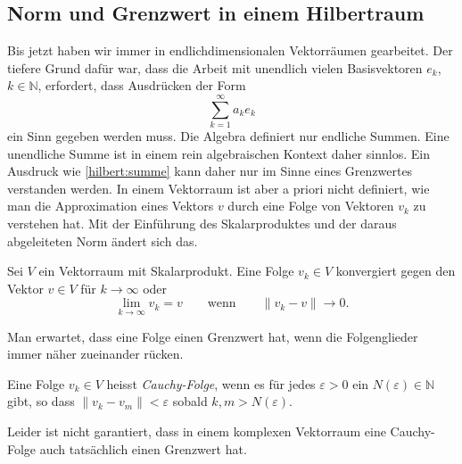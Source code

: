\subsection{Norm und Grenzwert in einem Hilbertraum
\label{subsection:norm-und-grenzwert}}
Bis jetzt haben wir immer in endlichdimensionalen Vektorräumen gearbeitet.
Der tiefere Grund dafür war, dass die Arbeit mit unendlich vielen Basisvektoren
$e_k$, $k\in\mathbb N$, erfordert, dass Ausdrücken der Form
\begin{equation}
\sum_{k=1}^\infty a_k e_k
\label{hilbert:summe}
\end{equation}
ein Sinn gegeben werden muss.
Die Algebra definiert nur endliche Summen.
Eine unendliche Summe ist in einem rein algebraischen Kontext daher
sinnlos.
Ein Ausdruck wie \eqref{hilbert:summe} kann daher nur im Sinne eines
Grenzwertes verstanden werden.
In einem Vektorraum ist aber a priori nicht definiert, wie man die
Approximation eines Vektors $v$ durch eine Folge von Vektoren $v_k$ zu
verstehen hat.
Mit der Einführung des Skalarproduktes und der daraus abgeleiteten Norm
ändert sich das.
\begin{definition}
Sei $V$ ein Vektorraum mit Skalarprodukt.
Eine Folge $v_k\in V$ konvergiert gegen den Vektor $v\in V$ für $k\to\infty$
oder
\[
\lim_{k\to\infty} v_k = v
\qquad\text{wenn}\qquad
\| v_k - v\| \to  0.
\]
\end{definition}

Man erwartet, dass eine Folge einen Grenzwert hat, wenn die Folgenglieder
immer näher zu\-ei\-nan\-der rücken.
%

\begin{definition}
Eine Folge $v_k\in V$ heisst {\em Cauchy-Folge}, wenn es für jedes
%
$\varepsilon > 0$ ein $N(\varepsilon)\in\mathbb N$ gibt, so dass
$\|v_k - v_m\| < \varepsilon$ sobald $k,m>N(\varepsilon)$.
\end{definition}

Leider ist nicht garantiert, dass in einem komplexen Vektorraum eine
Cauchy-Folge auch tatsächlich einen Grenzwert hat.

